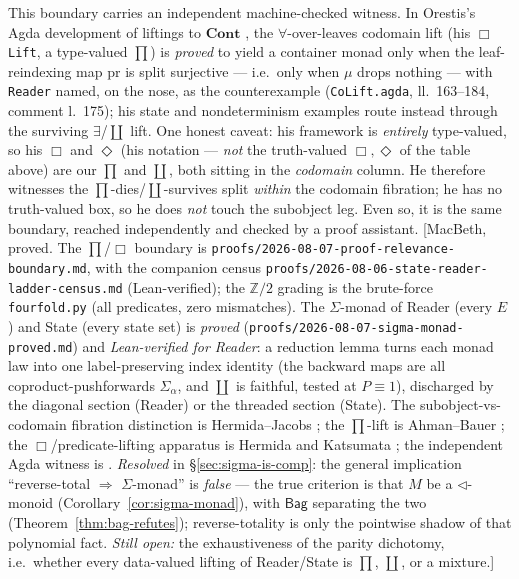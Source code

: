\documentclass[11pt,a4paper]{book}
\newcommand{\Cont}{\mathbf{Cont}}
\theoremstyle{plain}
\theoremstyle{definition}
\theoremstyle{remark}
\newcommand{\prov}[1]{\hfill\textsf{\footnotesize[#1]}}
\begin{document}
\begin{teachbox}
\smallskip
This boundary carries an independent machine-checked witness. In Orestis's Agda development of liftings to
$\Cont$ \cite{OrestisAgda}, the $\forall$-over-leaves codomain lift (his \texttt{\textup{$\Box$}Lift}, a type-valued
$\prod$) is \emph{proved} to yield a container monad only when the leaf-reindexing map $\mathrm{pr}$ is
split surjective --- i.e.\ only when $\mu$ drops nothing --- with \texttt{Reader} named, on the nose, as the
counterexample (\texttt{CoLift.agda}, ll.\ 163--184, comment l.\ 175); his state and nondeterminism
examples route instead through the surviving $\exists$/$\coprod$ lift. One honest caveat: his framework is
\emph{entirely} type-valued, so his $\Box$ and $\Diamond$ (his notation --- \emph{not} the truth-valued
$\Box,\Diamond$ of the table above) are our $\prod$ and $\coprod$, both sitting in the \emph{codomain}
column. He therefore witnesses the $\prod$-dies\slash$\coprod$-survives split \emph{within} the codomain
fibration; he has no truth-valued box, so he does \emph{not} touch the subobject leg. Even so,
it is the same boundary, reached independently and checked by a proof assistant.
\prov{MacBeth, proved. The $\prod$/$\Box$ boundary is
\texttt{proofs/2026-08-07-proof-relevance-boundary.md}, with the companion census
\texttt{proofs/2026-08-06-state-reader-ladder-census.md} (Lean-verified); the $\mathbb Z/2$ grading is the
brute-force \texttt{fourfold.py} (all predicates, zero mismatches). The $\Sigma$-monad of Reader (every $E$)
and State (every state set) is \emph{proved} (\texttt{proofs/2026-08-07-sigma-monad-proved.md}) and
\emph{Lean-verified for Reader}: a reduction lemma turns each monad law into one label-preserving index
identity (the backward maps are all coproduct-pushforwards $\Sigma_{\alpha}$, and $\coprod$ is faithful,
tested at $P\equiv 1$), discharged by the diagonal section (Reader) or the threaded section (State). The
subobject-vs-codomain fibration distinction is Hermida--Jacobs \cite{HermidaJacobs98}; the $\prod$-lift is
Ahman--Bauer \cite{AhmanBauer24}; the $\Box$/predicate-lifting apparatus is Hermida \cite{Hermida93} and
Katsumata \cite{Katsumata13}; the independent Agda witness is \cite{OrestisAgda}. \emph{Resolved} in
\S\ref{sec:sigma-is-comp}: the general implication ``reverse-total $\Rightarrow$ $\Sigma$-monad'' is
\emph{false} --- the true criterion is that $M$ be a $\triangleleft$-monoid (Corollary~\ref{cor:sigma-monad}),
with $\mathsf{Bag}$ separating the two (Theorem~\ref{thm:bag-refutes}); reverse-totality is only the
pointwise shadow of that polynomial fact. \emph{Still open:} the exhaustiveness of the parity
dichotomy, i.e.\ whether every data-valued lifting of Reader/State is $\prod$, $\coprod$, or a mixture.}
\end{teachbox}
\end{document}
